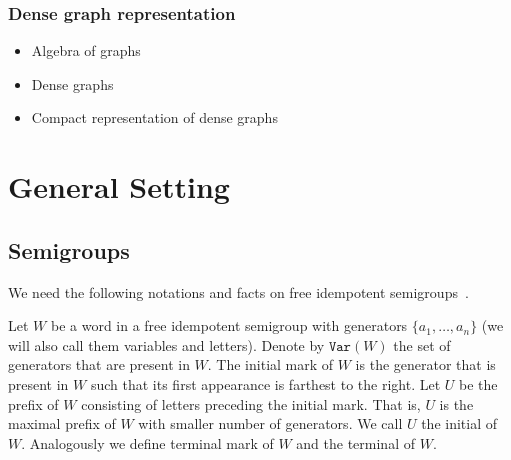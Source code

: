 \documentclass[11pt,letterpaper]{article}
\newcommand{\var}{\texttt{Var}}
\begin{document}

\subsubsection{Dense graph representation}\label{sec-dense-graph}


\begin{itemize}
  \item Algebra of graphs
  \item Dense graphs
  \item Compact representation of dense graphs
\end{itemize}







\section{General Setting}
\subsection{Semigroups}

We need the following notations and facts on free idempotent semigroups~\cite{GreenR52}.

Let $W$ be a word in a free idempotent semigroup with generators $\{a_1,\ldots, a_n\}$ (we will also call them variables and letters). Denote by $\var(W)$ the set of generators that are present in $W$. The initial mark of $W$ is the generator that is present in $W$ such that its first appearance is farthest to the right. Let $U$ be the prefix of $W$ consisting of letters preceding the initial mark. That is, $U$ is the maximal prefix of $W$ with smaller number of generators. We call $U$ the initial of $W$. Analogously we define terminal mark of $W$ and the terminal of $W$.
\end{document}
